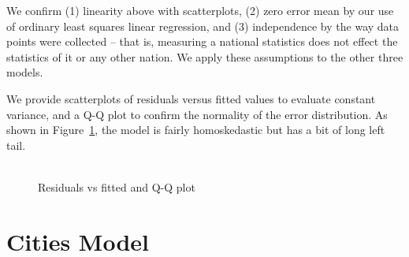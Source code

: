 \documentclass[12pt]{article}
\begin{document}
We confirm (1) linearity above with scatterplots, (2) zero error mean by our use of ordinary least squares linear regression, and (3) independence by the way data points were collected -- that is, measuring a national statistics does not effect the statistics of it or any other nation. We apply these assumptions to the other three models.

We provide scatterplots of residuals versus fitted values to evaluate constant variance, and a Q-Q plot to confirm the normality of the error distribution. As shown in Figure~\ref{climate_model_conditions}, the model is fairly homoskedastic but has a bit of long left tail.


\begin{figure}[h!]
  \centering
  \includegraphics[width=\textwidth]{images/climate_model_conditions}
  \caption{\label{climate_model_conditions}Residuals vs fitted and Q-Q plot}
\end{figure}






\section{Cities Model}
\end{document}
